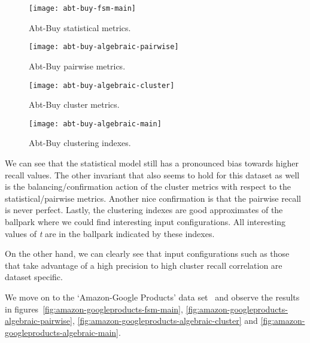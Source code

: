 \begin{figure*}[h]
    \begin{minipage}{0.24\textwidth}
        \centering
        \texttt{[image: abt-buy-fsm-main]}
        \caption{Abt-Buy statistical metrics.}
        \label{fig:abt-buy-fsm-main}
    \end{minipage}
    \begin{minipage}{0.24\textwidth}
        \centering
        \texttt{[image: abt-buy-algebraic-pairwise]}
        \caption{Abt-Buy pairwise metrics.}
        \label{fig:abt-buy-algebraic-pairwise}
    \end{minipage}
    \begin{minipage}{0.24\textwidth}
        \centering
        \texttt{[image: abt-buy-algebraic-cluster]}
        \caption{Abt-Buy cluster metrics.}
        \label{fig:abt-buy-algebraic-cluster}
    \end{minipage}
    \begin{minipage}{0.24\textwidth}
        \centering
        \texttt{[image: abt-buy-algebraic-main]}
        \caption{Abt-Buy clustering indexes.}
        \label{fig:abt-buy-algebraic-main}
    \end{minipage}
\end{figure*}\label{abt-buy}

We can see that the statistical model still has a pronounced bias towards higher
recall values.
The other invariant that also seems to hold for this dataset as well is the
balancing/confirmation action of the cluster metrics with respect to the
statistical/pairwise metrics.
Another nice confirmation is that the pairwise recall is never perfect.
Lastly, the clustering indexes are good approximates of the ballpark where
we could find  interesting input configurations.
All interesting values of \textit{t} are in the ballpark indicated by these
indexes.

On the other hand, we can clearly see that input configurations such as those
that take advantage of a high precision to high cluster recall correlation are
dataset specific.

We move on to the `Amazon-Google Products' data set~\cite{vldb2010} and observe
the results in figures~\ref{fig:amazon-googleproducts-fsm-main},
\ref{fig:amazon-googleproducts-algebraic-pairwise},
\ref{fig:amazon-googleproducts-algebraic-cluster} and
\ref{fig:amazon-googleproducts-algebraic-main}.

